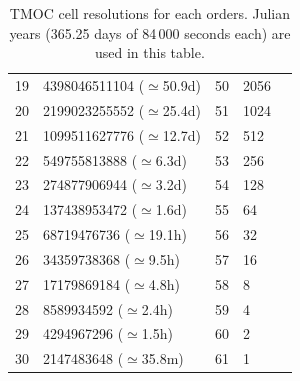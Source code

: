 \begin{table}[!htbp]
\begin{center}
{\begin{tabular} {|l | l| l| l| l|}
19      &       4398046511104 ($\simeq$50.9d)		& 50   & 2056 \\
20      &       2199023255552 ($\simeq$25.4d)		& 51   & 1024 \\
21      &       1099511627776 ($\simeq$12.7d)		& 52   & 512 \\
22      &       549755813888 ($\simeq$6.3d)		& 53   & 256 \\
23      &       274877906944 ($\simeq$3.2d)		& 54   & 128 \\
24      &       137438953472 ($\simeq$1.6d)		& 55   & 64 \\
25      &       68719476736 ($\simeq$19.1h)		& 56   & 32 \\
26      &       34359738368 ($\simeq$9.5h)		& 57   & 16 \\
27      &       17179869184 ($\simeq$4.8h)		& 58   & 8 \\
28      &       8589934592 ($\simeq$2.4h)		& 59   & 4 \\
29      &       4294967296 ($\simeq$1.5h)		& 60   & 2 \\
30      &       2147483648 ($\simeq$35.8m)		& 61   & 1 \\
   \hline
   \end{tabular}
   }
	\caption[TMOC order and cell resolutions]{TMOC cell resolutions for each orders. Julian years (365.25 days of 84\,000 seconds each) are used in this table.}\label{table:tmocorders}
\end{center}
\end{table}
